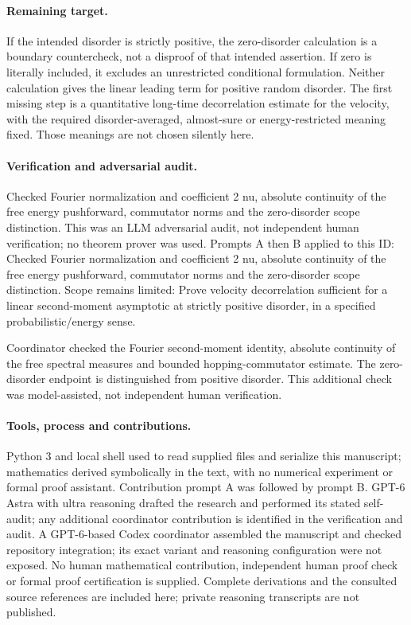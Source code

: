 \documentclass[11pt]{article}
\begin{document}
\paragraph{Remaining target.}If the intended disorder is strictly positive, the zero-disorder calculation is a boundary countercheck, not a disproof of that intended assertion. If zero is literally included, it excludes an unrestricted conditional formulation. Neither calculation gives the linear leading term for positive random disorder. The first missing step is a quantitative long-time decorrelation estimate for the velocity, with the required disorder-averaged, almost-sure or energy-restricted meaning fixed. Those meanings are not chosen silently here.

\paragraph{Verification and adversarial audit.}
Checked Fourier normalization and coefficient 2 nu, absolute continuity of the free energy pushforward, commutator norms and the zero-disorder scope distinction. This was an LLM adversarial audit, not independent human verification; no theorem prover was used. Prompts A then B applied to this ID: Checked Fourier normalization and coefficient 2 nu, absolute continuity of the free energy pushforward, commutator norms and the zero-disorder scope distinction. Scope remains limited: Prove velocity decorrelation sufficient for a linear second-moment asymptotic at strictly positive disorder, in a specified probabilistic/energy sense.

Coordinator checked the Fourier second-moment identity, absolute continuity of the free spectral measures and bounded hopping-commutator estimate. The zero-disorder endpoint is distinguished from positive disorder. This additional check was model-assisted, not independent human verification.

\paragraph{Tools, process and contributions.}
Python 3 and local shell used to read supplied files and serialize this manuscript; mathematics derived symbolically in the text, with no numerical experiment or formal proof assistant. Contribution prompt A was followed by prompt B. GPT-6 Astra with ultra reasoning drafted the research and performed its stated self-audit; any additional coordinator contribution is identified in the verification and audit. A GPT-6-based Codex coordinator assembled the manuscript and checked repository integration; its exact variant and reasoning configuration were not exposed. No human mathematical contribution, independent human proof check or formal proof certification is supplied. Complete derivations and the consulted source references are included here; private reasoning transcripts are not published.
\end{document}
